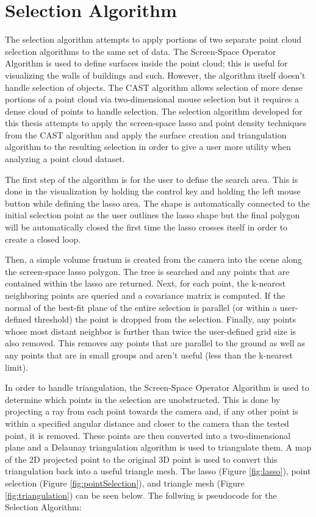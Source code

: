 \section{Selection Algorithm}

The selection algorithm attempts to apply portions of two separate point cloud
selection algorithms to the same set of data. The Screen-Space Operator
Algorithm \cite{1_VAST:VAST11:105-112} is used to define surfaces inside the
point cloud; this is useful for visualizing the walls of buildings and such.
However, the algorithm itself doesn't handle selection of objects. The CAST
algorithm \cite{2_yu:hal-01178051} allows selection of more dense portions of a
point cloud via two-dimensional mouse selection but it requires a dense cloud of
points to handle selection. The selection algorithm developed for this thesis
attempts to apply the screen-space lasso and point density techniques from the
CAST algorithm and apply the surface creation and triangulation algorithm to the
resulting selection in order to give a user more utility when analyzing a point
cloud dataset.

The first step of the algorithm is for the user to define the search area. This
is done in the visualization by holding the control key and holding the left
mouse button while defining the lasso area. The shape is automatically connected
to the initial selection point as the user outlines the lasso shape but the
final polygon will be automatically closed the first time the lasso crosses
itself in order to create a closed loop.

Then, a simple volume frustum is created from the camera into the scene along
the screen-space lasso polygon. The tree is searched and any points that are
contained within the lasso are returned. Next, for each point, the k-nearest
neighboring points are queried and a covariance matrix is computed. If the
normal of the best-fit plane of the entire selection is parallel (or within a
user-defined threshold) the point is dropped from the selection. Finally, any
points whose most distant neighbor is further than twice the user-defined grid
size is also removed. This removes any points that are parallel to the ground as
well as any points that are in small groups and aren't useful (less than the
k-nearest limit).

In order to handle triangulation, the Screen-Space Operator Algorithm is used to
determine which points in the selection are unobstructed. This is done by
projecting a ray from each point towards the camera and, if any other point is
within a specified angular distance and closer to the camera than the tested
point, it is removed. These points are then converted into a two-dimensional
plane and a Delaunay triangulation algorithm is used to triangulate them. A map
of the 2D projected point to the original 3D point is used to convert this
triangulation back into a useful triangle mesh. The lasso
(Figure \ref{fig:lasso}), point selection (Figure \ref{fig:pointSelection}), and
triangle mesh (Figure \ref{fig:triangulation}) can be seen below. The follwing
is pseudocode for the Selection Algorithm:

